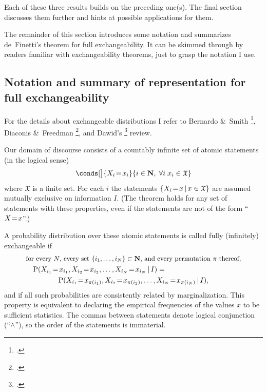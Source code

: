 \documentclass[\ifafour a4paper,12pt,\else a5paper,10pt,\fi%
onecolumn,oneside,article,%
british%
]{memoir}
\theoremstyle{remark}
\theoremstyle{innote}
\newcommand*{\citep}{\footcites}
\newcommand*{\amp}{\&}
\newcommand*{\NN}{\bm{\mathrm{N}}}
\DeclarePairedDelimiter\set{\{}{\}}
\newcommand*{\p}{\mathrm{P}}%
\renewcommand*{\|}[1][]{\nonscript\,#1\vert\nonscript\,\mathopen{}}
\newcommand*{\sects}{\S\S}%
\renewcommand*{\=}{\TextOrMath\texteq\eq}
\newcommand*{\X}[1]{X_{#1}}
\newcommand*{\x}[1]{x_{#1}}
\newcommand*{\sX}{\mathfrak{X}}
\begin{document}
Each of these three results builds on the preceding one(s). The final
section discusses them further and hints at possible applications for them.

The remainder of this section introduces some notation and summarizes
de~Finetti's theorem for full exchangeability. It can be skimmed through by
readers familiar with exchangeability theorems, just to grasp the notation
I use.

\subsection{Notation and summary of representation for full exchangeability}
\label{sec:setup}


For the details about exchangeable distributions I refer to Bernardo \amp\
Smith \citep[\sects~4.3, 4.6]{bernardoetal1994_r2000}, Diaconis \amp\
Freedman \citep{diaconisetal1980,diaconisetal1980b}, and Dawid's
\citep{dawid2013} review. 

Our domain of discourse consists of a countably infinite set of atomic
statements (in the logical sense)
 \begin{equation}
  \label{eq:statements}
  \conds[\big]{\X{i}\=\x{i}}{i \in \NN,\;
 \forall i\;\x{i} \in \sX}
\end{equation}
where $\sX$ is a finite set. For each $i$ the statements
$\set{\X{i}\=x \| x \in \sX}$ are assumed mutually exclusive on information
$I$. (The theorem holds for any set of statements with these properties,
even if the statements are not of the form \enquote{$X\=x$}.)

A probability distribution over these atomic statements
is called fully (infinitely) exchangeable if
\begin{multline}
  \label{eq:exchangeable}
  \text{\small for every $N$, every set
    $\set{i_{1},\dotsc,i_{N}}\subset \NN$, and every permutation $\pi$ thereof,}
  \\
  \shoveleft{\p( \X{i_{1}}\=\x{i_{1}}, \X{i_{2}}\=\x{i_{2}},\dotsc,\X{i_{N}}\=\x{i_{N}}
    \| I) ={}}\\
  \p( \X{i_{1}}\=\x{\pi(i_{1})},
  \X{i_{2}}\=\x{\pi(i_{2})},\dotsc,\X{i_{N}}\=\x{\pi(i_{N})}   \| I),
\end{multline}
and if all such probabilities are consistently related by marginalization.
This property is equivalent to declaring the empirical frequencies of the
values $x$ to be sufficient statistics. The commas between statements
denote logical conjunction (\enquote{$\land$}), so the order of the
statements is immaterial.
\end{document}
